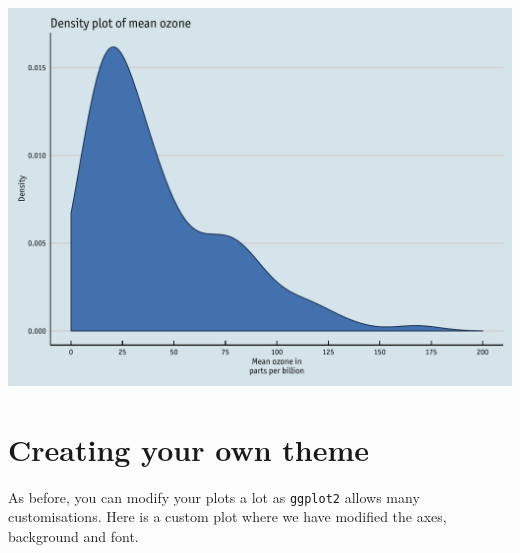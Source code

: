\begin{center}\includegraphics[width=0.55\linewidth]{figures/density_11-1} \end{center}

\section{Creating your own theme}\label{creating-your-own-theme-7}

As before, you can modify your plots a lot as \texttt{ggplot2} allows
many customisations. Here is a custom plot where we have modified the
axes, background and font.

